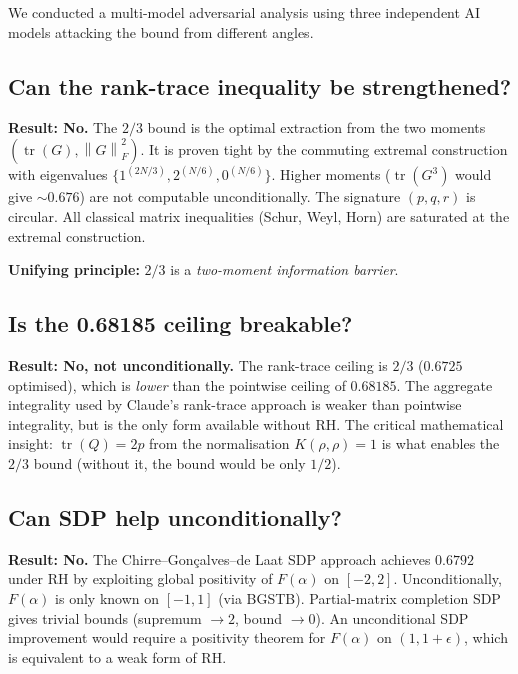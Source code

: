 \documentclass[11pt,a4paper]{article}
\theoremstyle{definition}
\theoremstyle{remark}
\newcommand{\tr}{\operatorname{tr}}
\newcommand{\norm}[1]{\left\|{#1}\right\|}
\begin{document}
We conducted a multi-model adversarial analysis using three independent AI models attacking the bound from different angles.

\subsection{Can the rank-trace inequality be strengthened?}

\textbf{Result: No.} The $2/3$ bound is the optimal extraction from the two moments $(\tr(G), \norm{G}_F^2)$. It is proven tight by the commuting extremal construction with eigenvalues $\{1^{(2N/3)}, 2^{(N/6)}, 0^{(N/6)}\}$. Higher moments ($\tr(G^3)$ would give $\sim 0.676$) are not computable unconditionally. The signature $(p, q, r)$ is circular. All classical matrix inequalities (Schur, Weyl, Horn) are saturated at the extremal construction.

\textbf{Unifying principle:} $2/3$ is a \emph{two-moment information barrier}.

\subsection{Is the 0.68185 ceiling breakable?}

\textbf{Result: No, not unconditionally.} The rank-trace ceiling is $2/3$ ($0.6725$ optimised), which is \emph{lower} than the pointwise ceiling of $0.68185$. The aggregate integrality used by Claude's rank-trace approach is weaker than pointwise integrality, but is the only form available without RH. The critical mathematical insight: $\tr(Q) = 2p$ from the normalisation $K(\rho, \rho) = 1$ is what enables the $2/3$ bound (without it, the bound would be only $1/2$).

\subsection{Can SDP help unconditionally?}

\textbf{Result: No.} The Chirre--Gon\c{c}alves--de Laat SDP approach achieves $0.6792$ under RH by exploiting global positivity of $F(\alpha)$ on $[-2, 2]$. Unconditionally, $F(\alpha)$ is only known on $[-1, 1]$ (via BGSTB). Partial-matrix completion SDP gives trivial bounds (supremum $\to 2$, bound $\to 0$). An unconditional SDP improvement would require a positivity theorem for $F(\alpha)$ on $(1, 1+\epsilon)$, which is equivalent to a weak form of RH.

\label{sec:frontier}
\end{document}
